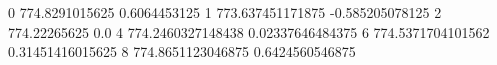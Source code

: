 0 774.8291015625 0.6064453125
1 773.637451171875 -0.585205078125
2 774.22265625 0.0
4 774.2460327148438 0.02337646484375
6 774.5371704101562 0.31451416015625
8 774.8651123046875 0.6424560546875
